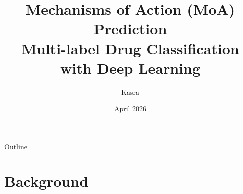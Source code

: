 \documentclass[aspectratio=169, 10pt]{beamer}
\title[MoA Prediction]{%
  \textbf{Mechanisms of Action (MoA) Prediction}\\[0.3em]
  {\normalsize Multi-label Drug Classification with Deep Learning}}
\author[Kasra]{Kasra}
\institute[Genomics Project]{Genomics Course Project}
\date{April 2026}
\begin{document}

\begin{frame}
  \titlepage
\end{frame}

\begin{frame}{Outline}
  \tableofcontents
\end{frame}

\section{Background}
\end{document}
